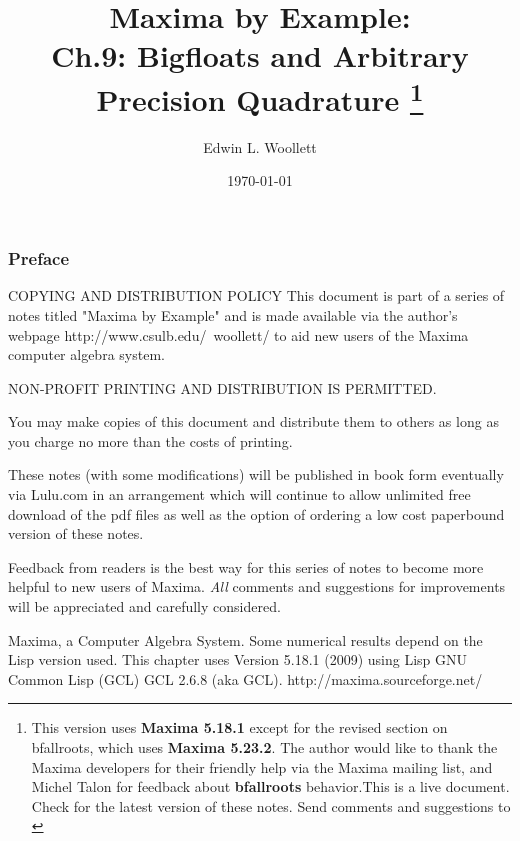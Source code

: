 \documentclass[12pt]{article}
\title{  Maxima by Example:\\ Ch.9: Bigfloats and Arbitrary Precision Quadrature
            \thanks{This version uses \textbf{Maxima 5.18.1} except for 
			the revised section on bfallroots, which uses \textbf{Maxima 5.23.2}.
			The author would like to thank the Maxima developers for their friendly help via 
            the Maxima mailing list, and Michel Talon for feedback 
			about \textbf{bfallroots} behavior.This is a live
            document. Check \; \textbf{ \tedhome } \; for the latest version of these notes. Send comments and
			 suggestions to \textbf{\tedmail} } }
\author{ Edwin L. Woollett}
\date{\today}
\newcommand{\tcdb}{\textcolor{mdb}}
\newcommand{\tcbr}{\textcolor{BrickRed}}
\begin{document}
\maketitle
\tableofcontents
{}
\newpage
\subsubsection*{Preface}
\begin{myVerbatim2} 
COPYING AND DISTRIBUTION POLICY    
This document is part of a series of notes titled
"Maxima by Example" and is made available
via the author's webpage http://www.csulb.edu/~woollett/
to aid new users of the Maxima computer algebra system.	
	
NON-PROFIT PRINTING AND DISTRIBUTION IS PERMITTED.
	
You may make copies of this document and distribute them
to others as long as you charge no more than the costs of printing.	

These notes (with some modifications) will be published in book form
eventually via Lulu.com in an arrangement which will continue
to allow unlimited free download of the pdf files as well as the option
of ordering a low cost paperbound version of these notes.
\end{myVerbatim2}	
\smallskip
\noindent \tcbr{Feedback from readers is the best way for this series of notes
  to become more helpful to new users of Maxima}.
\tcdb{\emph{All} comments and suggestions for improvements will be appreciated and
  carefully considered}.
\smallskip
{}  
\smallskip
\begin{myVerbatim2s}
  Maxima, a Computer Algebra System.
  Some numerical results depend on the Lisp version used.
  This chapter uses Version 5.18.1 (2009) using Lisp GNU 
  Common Lisp (GCL) GCL 2.6.8 (aka GCL).
  http://maxima.sourceforge.net/
\end{myVerbatim2s}
\newpage
\setcounter{section}{9}
\pagestyle{headings}
\end{document}
